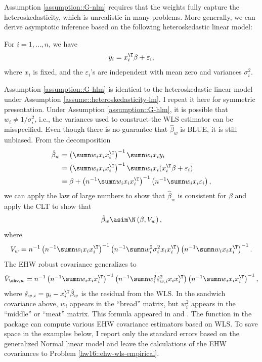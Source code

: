 Assumption \ref{assumption::G-nlm} requires that the weights fully capture the heteroskedasticity, which is unrealistic in many problems. More generally, we can derive asymptotic inference based on the following heteroskedastic linear model:


\begin{assumption}
\label{assumption::G-hlm}
For $i=1, \ldots, n$, we have 
$$
y_{i}=x_{i}^{\T}\beta+\varepsilon_{i}, 
$$
where $x_i$ is fixed, and the $\varepsilon_{i}$'s are independent with mean zero and
variances $\sigma_{i}^{2}$.
\end{assumption}

Assumption \ref{assumption::G-hlm} is identical to the heteroskedastic linear model under Assumption \ref{assume::heteroskedasticity-lm}. I repeat it here for symmetric presentation. 
Under Assumption \ref{assumption::G-hlm}, it is possible that $w_{i}\neq1/\sigma_{i}^{2}$,
i.e., the variances used to construct the WLS estimator can be misspecified.
Even though there is no guarantee that $\hat{\beta}_{w}$ is BLUE,
it is still unbiased. From the decomposition
\begin{align*}
\hat{\beta}_{w} & =\left(\sumn w_{i}x_{i}x_{i}^{\T}\right)^{-1}\sumn w_{i}x_{i}y_{i}\\
 & =\left(\sumn w_{i}x_{i}x_{i}^{\T}\right)^{-1}\sumn w_{i}x_{i}(x_{i}^{\T}\beta+\varepsilon_{i})\\
 & =\beta+\left(n^{-1}\sumn w_{i}x_{i}x_{i}^{\T}\right)^{-1}\left(n^{-1}\sumn w_{i}x_{i}\varepsilon_{i}\right),
\end{align*}
we can apply the law of large numbers to show that $\hat{\beta}_{w}$
is consistent for $\beta$ and apply the CLT to
show that 
\[
\hat{\beta}_{w}\asim\N\left(\beta,V_w\right),
\]
where 
\[
V_w  = n^{-1}\left(n^{-1}\sumn w_{i}x_{i}x_{i}^{\T}\right)^{-1}\left(n^{-1}\sumn w_{i}^{2}\sigma_{i}^{2}x_{i}x_{i}^{\T}\right)\left(n^{-1}\sumn w_{i}x_{i}x_{i}^{\T}\right)^{-1}. 
\]
The EHW robust covariance generalizes to
\[
\hat{V}_{\ehw, w}=n^{-1}\left(n^{-1}\sumn w_{i}x_{i}x_{i}^{\T}\right)^{-1}\left(n^{-1}\sumn w_{i}^{2}\hat{\varepsilon}_{w,i}^{2}x_{i}x_{i}^{\T}\right)\left(n^{-1}\sumn w_{i}x_{i}x_{i}^{\T}\right)^{-1},
\]
where $\hat{\varepsilon}_{w,i}=y_{i}-x_{i}^{\T}\hat{\beta}_{w}$ is
the residual from the WLS. In the sandwich covariance above, $w_{i}$
appears in the ``bread'' matrix, but $w_{i}^{2}$ appears in the ``middle'' or ``meat'' matrix. This formula appeared in \citet{magee1998improving} and \citet{romano2017resurrecting}. The  function
 in the 
 package  can compute various EHW covariance estimators based on WLS. To save space in the examples below, I report only the standard errors based on the generalized Normal linear model and leave the calculations of the EHW covariances to Problem \ref{hw16::ehw-wls-empirical}. 





